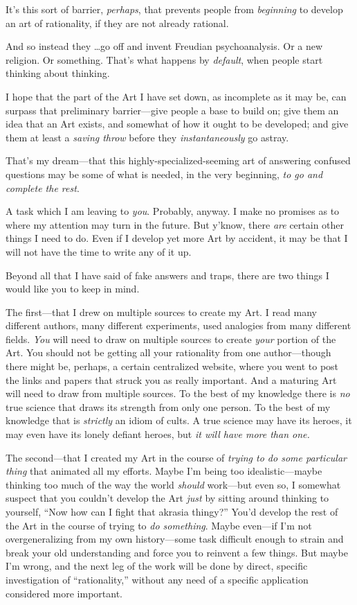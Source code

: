 {
 It's this sort of barrier, \textit{perhaps}, that
prevents people from \textit{beginning} to develop an art of
rationality, if they are not already rational.}

{
 And so instead they \ldots go off and invent Freudian
psychoanalysis. Or a new religion. Or something. That's
what happens by \textit{default}, when people start thinking about
thinking.}

{
 I hope that the part of the Art I have set down, as incomplete as
it may be, can surpass that preliminary barrier---give people a base to
build on; give them an idea that an Art exists, and somewhat of how it
ought to be developed; and give them at least a \textit{saving throw}
before they \textit{instantaneously} go astray.}

{
 That's my dream---that this
highly-specialized-seeming art of answering confused questions may be
some of what is needed, in the very beginning, \textit{to go and
complete the rest}.}

{
 A task which I am leaving to \textit{you}. Probably, anyway. I
make no promises as to where my attention may turn in the future. But
y'know, there \textit{are} certain other things I need
to do. Even if I develop yet more Art by accident, it may be that I
will not have the time to write any of it up.}

{
 Beyond all that I have said of fake answers and traps, there are
two things I would like you to keep in mind.}

{
 The first---that I drew on multiple sources to create my Art. I
read many different authors, many different experiments, used analogies
from many different fields. \textit{You} will need to draw on multiple
sources to create \textit{your} portion of the Art. You should not be
getting all your rationality from one author---though there might be,
perhaps, a certain centralized website, where you went to post the
links and papers that struck you as really important. And a maturing
Art will need to draw from multiple sources. To the best of my
knowledge there is \textit{no} true science that draws its strength
from only one person. To the best of my knowledge that is
\textit{strictly} an idiom of cults. A true science may have its
heroes, it may even have its lonely defiant heroes, but \textit{it will
have more than one.}}

{
 The second---that I created my Art in the course of \textit{trying
to do some particular thing} that animated all my efforts. Maybe
I'm being too idealistic---maybe thinking too much of
the way the world \textit{should} work---but even so, I somewhat
suspect that you couldn't develop the Art \textit{just}
by sitting around thinking to yourself, ``Now how can
I fight that akrasia thingy?'' You'd
develop the rest of the Art in the course of trying to \textit{do
something}. Maybe even---if I'm not overgeneralizing
from my own history---some task difficult enough to strain and break
your old understanding and force you to reinvent a few things. But
maybe I'm wrong, and the next leg of the work will be
done by direct, specific investigation of
``rationality,'' without any need of
a specific application considered more important.}

